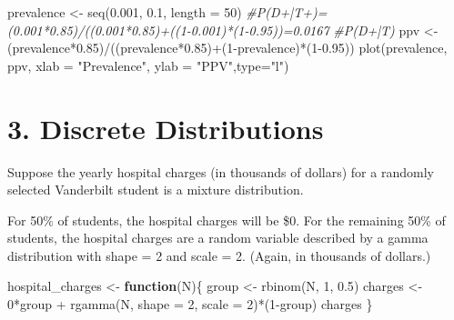 \documentclass[
]{article}
\newenvironment{Shaded}{\begin{snugshade}}{\end{snugshade}}
\newcommand{\AttributeTok}[1]{\textcolor[rgb]{0.77,0.63,0.00}{#1}}
\newcommand{\CommentTok}[1]{\textcolor[rgb]{0.56,0.35,0.01}{\textit{#1}}}
\newcommand{\ControlFlowTok}[1]{\textcolor[rgb]{0.13,0.29,0.53}{\textbf{#1}}}
\newcommand{\DecValTok}[1]{\textcolor[rgb]{0.00,0.00,0.81}{#1}}
\newcommand{\FloatTok}[1]{\textcolor[rgb]{0.00,0.00,0.81}{#1}}
\newcommand{\FunctionTok}[1]{\textcolor[rgb]{0.00,0.00,0.00}{#1}}
\newcommand{\NormalTok}[1]{#1}
\newcommand{\OtherTok}[1]{\textcolor[rgb]{0.56,0.35,0.01}{#1}}
\newcommand{\SpecialCharTok}[1]{\textcolor[rgb]{0.00,0.00,0.00}{#1}}
\newcommand{\StringTok}[1]{\textcolor[rgb]{0.31,0.60,0.02}{#1}}
\begin{document}
\begin{Shaded}
\begin{Highlighting}[]
\NormalTok{prevalence }\OtherTok{\textless{}{-}} \FunctionTok{seq}\NormalTok{(}\FloatTok{0.001}\NormalTok{, }\FloatTok{0.1}\NormalTok{, }\AttributeTok{length =} \DecValTok{50}\NormalTok{)}
\CommentTok{\#P(D+|T+)=(0.001*0.85)/((0.001*0.85)+((1{-}0.001)*(1{-}0.95))=0.0167}
\CommentTok{\#P(D+|T)}
\NormalTok{ppv }\OtherTok{\textless{}{-}}\NormalTok{ (prevalence}\SpecialCharTok{*}\FloatTok{0.85}\NormalTok{)}\SpecialCharTok{/}\NormalTok{((prevalence}\SpecialCharTok{*}\FloatTok{0.85}\NormalTok{)}\SpecialCharTok{+}\NormalTok{(}\DecValTok{1}\SpecialCharTok{{-}}\NormalTok{prevalence)}\SpecialCharTok{*}\NormalTok{(}\DecValTok{1}\FloatTok{{-}0.95}\NormalTok{))}
\FunctionTok{plot}\NormalTok{(prevalence, ppv, }\AttributeTok{xlab =} \StringTok{"Prevalence"}\NormalTok{, }\AttributeTok{ylab =} \StringTok{"PPV"}\NormalTok{,}\AttributeTok{type=}\StringTok{"l"}\NormalTok{)}
\end{Highlighting}
\end{Shaded}

\hypertarget{discrete-distributions}{%
\section{3. Discrete Distributions}\label{discrete-distributions}}

Suppose the yearly hospital charges (in thousands of dollars) for a
randomly selected Vanderbilt student is a mixture distribution.

For 50\% of students, the hospital charges will be \$0. For the
remaining 50\% of students, the hospital charges are a random variable
described by a gamma distribution with shape = 2 and scale = 2. (Again,
in thousands of dollars.)

\begin{Shaded}
\begin{Highlighting}[]
\NormalTok{hospital\_charges }\OtherTok{\textless{}{-}} \ControlFlowTok{function}\NormalTok{(N)\{}
\NormalTok{  group }\OtherTok{\textless{}{-}} \FunctionTok{rbinom}\NormalTok{(N, }\DecValTok{1}\NormalTok{, }\FloatTok{0.5}\NormalTok{)}
\NormalTok{  charges }\OtherTok{\textless{}{-}} \DecValTok{0}\SpecialCharTok{*}\NormalTok{group }\SpecialCharTok{+} \FunctionTok{rgamma}\NormalTok{(N, }\AttributeTok{shape =} \DecValTok{2}\NormalTok{, }\AttributeTok{scale =} \DecValTok{2}\NormalTok{)}\SpecialCharTok{*}\NormalTok{(}\DecValTok{1}\SpecialCharTok{{-}}\NormalTok{group)}
\NormalTok{  charges}
\NormalTok{\}}
\end{Highlighting}
\end{Shaded}
\end{document}
